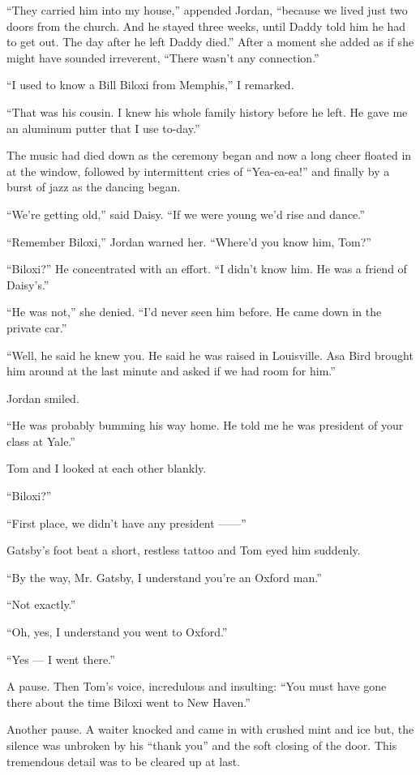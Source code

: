 \documentclass{znotebook}
\begin{document}
``They carried him into my house,'' appended Jordan, ``because we lived just two doors from the church. And he stayed three weeks, until Daddy told him he had to get out. The day after he left Daddy died.'' After a moment she added as if she might have sounded irreverent, ``There wasn’t any connection.''

``I used to know a Bill Biloxi from Memphis,'' I remarked.

``That was his cousin. I knew his whole family history before he left. He gave me an aluminum putter that I use to-day.''

The music had died down as the ceremony began and now a long cheer floated in at the window, followed by intermittent cries of ``Yea-ea-ea!'' and finally by a burst of jazz as the dancing began.

``We’re getting old,'' said Daisy. ``If we were young we’d rise and dance.''

``Remember Biloxi,'' Jordan warned her. ``Where’d you know him, Tom?''

``Biloxi?'' He concentrated with an effort. ``I didn’t know him. He was a friend of Daisy’s.''

``He was not,'' she denied. ``I’d never seen him before. He came down in the private car.''

``Well, he said he knew you. He said he was raised in Louisville. Asa Bird brought him around at the last minute and asked if we had room for him.''

Jordan smiled.

``He was probably bumming his way home. He told me he was president of your class at Yale.''

Tom and I looked at each other blankly.

``Biloxi?''

``First place, we didn’t have any president ——''

Gatsby’s foot beat a short, restless tattoo and Tom eyed him suddenly.

``By the way, Mr. Gatsby, I understand you’re an Oxford man.''

``Not exactly.''

``Oh, yes, I understand you went to Oxford.''

``Yes — I went there.''

A pause. Then Tom’s voice, incredulous and insulting: ``You must have gone there about the time Biloxi went to New Haven.''

Another pause. A waiter knocked and came in with crushed mint and ice but, the silence was unbroken by his ``thank you'' and the soft closing of the door. This tremendous detail was to be cleared up at last.
\end{document}
